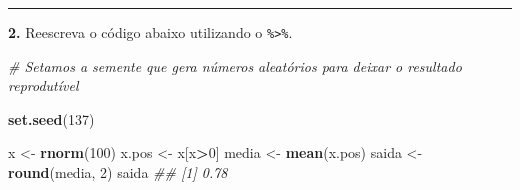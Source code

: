 \documentclass[
]{book}
\newenvironment{Shaded}{\begin{snugshade}}{\end{snugshade}}
\newcommand{\CommentTok}[1]{\textcolor[rgb]{0.56,0.35,0.01}{\textit{#1}}}
\newcommand{\DataTypeTok}[1]{\textcolor[rgb]{0.13,0.29,0.53}{#1}}
\newcommand{\DecValTok}[1]{\textcolor[rgb]{0.00,0.00,0.81}{#1}}
\newcommand{\KeywordTok}[1]{\textcolor[rgb]{0.13,0.29,0.53}{\textbf{#1}}}
\newcommand{\NormalTok}[1]{#1}
\newcommand{\OperatorTok}[1]{\textcolor[rgb]{0.81,0.36,0.00}{\textbf{#1}}}
\newcommand{\StringTok}[1]{\textcolor[rgb]{0.31,0.60,0.02}{#1}}
\begin{document}
\begin{Shaded}
\end{Shaded}

\begin{center}\rule{0.5\linewidth}{0.5pt}\end{center}

\textbf{2.} Reescreva o código abaixo utilizando o \texttt{\%\textgreater{}\%}.

\begin{Shaded}
\begin{Highlighting}[]
\CommentTok{# Setamos a semente que gera números aleatórios para deixar o resultado reprodutível}

\KeywordTok{set.seed}\NormalTok{(}\DecValTok{137}\NormalTok{)}

\NormalTok{x <-}\StringTok{ }\KeywordTok{rnorm}\NormalTok{(}\DecValTok{100}\NormalTok{)}
\NormalTok{x.pos <-}\StringTok{ }\NormalTok{x[x}\OperatorTok{>}\DecValTok{0}\NormalTok{]}
\NormalTok{media <-}\StringTok{ }\KeywordTok{mean}\NormalTok{(x.pos)}
\NormalTok{saida <-}\StringTok{ }\KeywordTok{round}\NormalTok{(media, }\DecValTok{2}\NormalTok{)}
\NormalTok{saida}
\CommentTok{## [1] 0.78}
\end{Highlighting}
\end{Shaded}

\begin{Shaded}
\end{Shaded}
\end{document}

